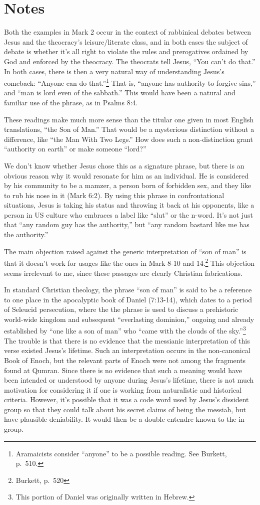 \documentclass[10pt,twoside]{article} %
\newcommand{\quotesize}{\normalsize{}}
\newcommand{\maintextquotesize}{\renewcommand{\quotesize}{\large{}}}
\newcommand{\notequotesize}{\renewcommand{\quotesize}{\normalsize{}}}
\newenvironment{notesection}[1]{
  \setcounter{secnumdepth}{0}          %
  \section*{#1}
  \setcounter{secnumdepth}{2}          %
  \notequotesize
}%
{
  \maintextquotesize
}
\begin{document}
\begin{notesection}{Notes}
Both the examples in Mark 2 occur in the context of rabbinical debates between
Jesus and the theocracy's leisure/literate class, and in both cases the subject of debate is whether it's all
right to violate the rules and prerogatives ordained by God and enforced by the theocracy.
The theocrats tell Jesus, ``You can't do that.''
In both cases, there is then a very natural way of understanding Jesus's comeback: ``Anyone can do that.''\footnote{Aramaicists consider
``anyone'' to be a possible reading. See Burkett, p.~510.}
That is, ``anyone has authority to forgive sins,'' and ``man is lord even of the sabbath.'' This would have been a natural
and familiar use of the phrase, as in Psalms 8:4.

These readings make much more sense than the titular one given in most
English translations, ``the Son of Man.'' That would be a mysterious distinction without a
difference, like ``the Man With Two Legs.'' How does such a non-distinction
grant ``authority on earth'' or make someone ``lord?''

We don't know whether Jesus chose this as a signature phrase, but there is an obvious reason why it would resonate for him as an individual.
He is considered by his community to be a mamzer, a person born of forbidden sex, and they
like to rub his nose in it (Mark 6:2). By using this phrase in confrontational situations, Jesus
is taking his status and throwing it back at his opponents, like a person in US culture who
embraces a label like ``slut'' or the n-word. It's not just that ``any random guy has the authority,''
but ``any random bastard like me has the authority.''

The main objection raised against the generic interpretation of ``son of man'' is that it doesn't
work for usages like the ones in Mark 8-10 and 14.\footnote{Burkett, p.~520} This objection seems
irrelevant to me, since these passages are clearly Christian fabrications.

In standard Christian theology, the phrase ``son of man'' is said to be a reference to
one place in the apocalyptic book of Daniel (7:13-14), which dates to a period of Seleucid persecution,
where the the phrase is used to discuss a prehistoric world-wide kingdom and
subsequent ``everlasting dominion,'' ongoing and already established by ``one like a son of man'' who
``came with the clouds of the sky.''\footnote{This portion of Daniel was originally written in Hebrew.}
The trouble is that there is no evidence that the messianic interpretation of this verse existed
Jesus's lifetime. Such an interpretation occurs in the non-canonical Book of Enoch, but the relevant
parts of Enoch were not among the fragments found at Qumran. Since there is no evidence that such
a meaning would have been intended or understood by anyone during Jesus's lifetime, there is not
much motivation for considering it if one is working from naturalistic and historical criteria.
However, it's possible that it was a code word used by Jesus's dissident group so that they could
talk about his secret claims of being the messiah, but have plausible deniability. It would then
be a double entendre known to the in-group.


\end{notesection}
\end{document}
